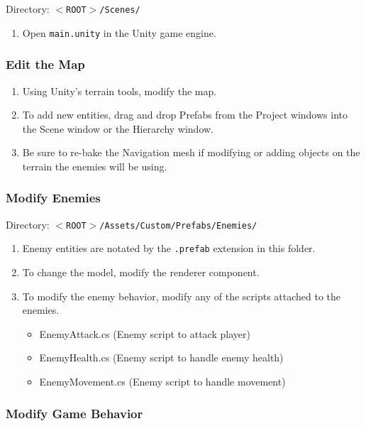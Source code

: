 \documentclass[a4paper]{refart}
\begin{document}
Directory: \texttt{$<$ROOT$>$/Scenes/}

\begin{enumerate}
	\item Open \texttt{main.unity} in the Unity game engine.
\end{enumerate}

\subsubsection{Edit the Map}

\begin{enumerate}
	\item Using Unity's terrain tools, modify the map.
	\item To add new entities, drag and drop Prefabs from the Project windows into the Scene window or the Hierarchy window.
	\item Be sure to re-bake the Navigation mesh if modifying or adding objects on the terrain the enemies will be using.
\end{enumerate}

\subsubsection{Modify Enemies}

Directory: \texttt{$<$ROOT$>$/Assets/Custom/Prefabs/Enemies/}

\begin{enumerate}
	\item Enemy entities are notated by the \texttt{.prefab} extension in this folder.
	\item To change the model, modify the renderer component.
	\item To modify the enemy behavior, modify any of the scripts attached to the enemies.
	\begin{itemize}
		\item EnemyAttack.cs (Enemy script to attack player)
		\item EnemyHealth.cs (Enemy script to handle enemy health)
		\item EnemyMovement.cs (Enemy script to handle movement)
	\end{itemize}
\end{enumerate}

\subsubsection{Modify Game Behavior}
\end{document}
